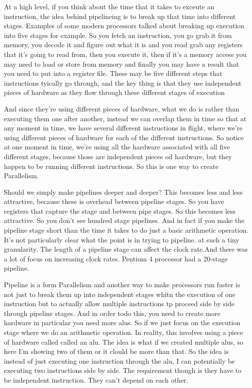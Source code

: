 At a high level, if you think about the time that it takes to exceute an instruction,
the idea behind pipelineing is to break up that time into different stages.
Examples of some modern processors talked about breaking up execution into five 
stages for example. So you fetch an instruction, you go grab it from memory, you 
decode it and figure out what it is and you read grab any registers that it's going to read
from, then you execute it, then if it's a memory access you may need to load or store
from memory and finally you may have a result that you need to put into a register file.
These may be five different steps that instructions tyically go through, and the key thing is 
that they use independent pieces of hardware as they flow through these different stages of execution

And since they're using different pieces of hardware, what we do is rather than executing them 
one after another, instead we can overlap them in time so that at any moment in time, we have 
several different instructions in flight, where we're using different pieces of hardware for each 
of the different instructions. So notice at one moment in time, we're using all the hardware
associated with all five different stages, because those are independent pieces od hardware, but
they happen to be running different instructions. So this is one way to create Parallelism.

Should we simply make pipelines deeper and deeper? This becomes less and less attractive, 
because these is overhead between pipeline stages. So you have registers that capture the 
stage and between pipe stages. So this becomes less attractive. So you don't see hundred stage
pipelines. And in fact if you make the pipeline stage short than the time it takes to do just
a basic arithmetic operation. It's not particularly clear what the point is in trying to pipeline.
at such a tiny granularity. The length of a pipeline stage can affect the clock rate.And there 
was a lot of focus on increasing clock rates. Pentium 4 processor had a 20-stage pipeline.

Pipeline is a form Parallelism and another way to make processors run faster is not just to break them up into independent stages whitn the execution of one instruction but to actually allow multiple instructions tp proceed side by side through pipeline stages.
And in order todo this, you need to create more hardware in particular you need more alus. 
So if we just focus on the execution stage where we do an arithmetic operation.
In reality, this involves using a piece of hardware called called an alu. The idea is 
what if we created multiple alus, so here I'm showing two of them or it clould be more 
than that. So the idea is instead of just executing one instruction through the alu,
I can potentially be executing two instructions side by side. 
The requirement though is they have to be independent instruction. They can't depend
on each other.

